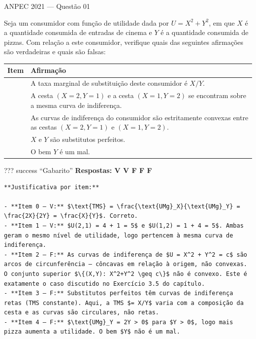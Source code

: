 \documentclass[11pt,twoside,openright]{book}
\begin{document}
\begin{infobox}{ANPEC 2021 — Questão 01}

Seja um consumidor com função de utilidade dada por \(U = X^2 + Y^2\),
em que \(X\) é a quantidade consumida de entradas de cinema e \(Y\) é a
quantidade consumida de pizzas. Com relação a este consumidor, verifique
quais das seguintes afirmações são verdadeiras e quais são falsas:

{\def\LTcaptype{none} %
\begin{longtable}[]{@{}
  >{\raggedright\arraybackslash}p{}
  >{\raggedright\arraybackslash}p{}@{}}
\toprule\noalign{}
\begin{minipage}[b]{\linewidth}\raggedright
Item
\end{minipage} & \begin{minipage}[b]{\linewidth}\raggedright
Afirmação
\end{minipage} \\
\midrule\noalign{}
\endhead
\bottomrule\noalign{}
\endlastfoot
0 & A taxa marginal de substituição deste consumidor é \(X/Y\). \\
1 & A cesta \((X = 2, Y = 1)\) e a cesta \((X = 1, Y = 2)\) se encontram
sobre a mesma curva de indiferença. \\
2 & As curvas de indiferença do consumidor são estritamente convexas
entre as cestas \((X = 2, Y = 1)\) e \((X = 1, Y = 2)\). \\
3 & \(X\) e \(Y\) são substitutos perfeitos. \\
4 & O bem \(Y\) é um mal. \\
\end{longtable}
}

??? success ``Gabarito'' \textbf{Respostas: V V F F F}

\begin{verbatim}
**Justificativa por item:**

- **Item 0 — V:** $\text{TMS} = \frac{\text{UMg}_X}{\text{UMg}_Y} = \frac{2X}{2Y} = \frac{X}{Y}$. Correto.
- **Item 1 — V:** $U(2,1) = 4 + 1 = 5$ e $U(1,2) = 1 + 4 = 5$. Ambas geram o mesmo nível de utilidade, logo pertencem à mesma curva de indiferença.
- **Item 2 — F:** As curvas de indiferença de $U = X^2 + Y^2 = c$ são arcos de circunferência — côncavas em relação à origem, não convexas. O conjunto superior $\{(X,Y): X^2+Y^2 \geq c\}$ não é convexo. Este é exatamente o caso discutido no Exercício 3.5 do capítulo.
- **Item 3 — F:** Substitutos perfeitos têm curvas de indiferença retas (TMS constante). Aqui, a TMS $= X/Y$ varia com a composição da cesta e as curvas são circulares, não retas.
- **Item 4 — F:** $\text{UMg}_Y = 2Y > 0$ para $Y > 0$, logo mais pizza aumenta a utilidade. O bem $Y$ não é um mal.
\end{verbatim}

\end{infobox}
\end{document}
